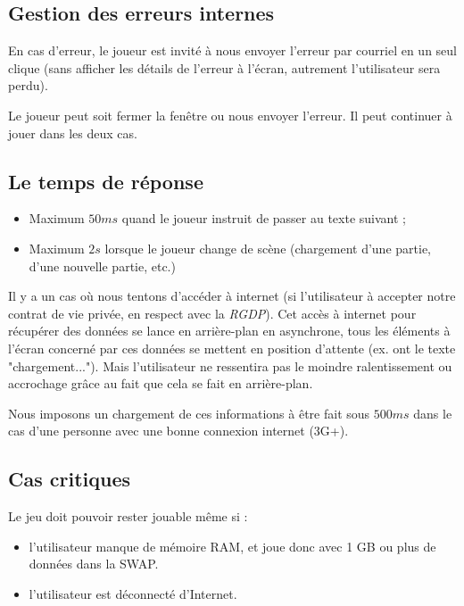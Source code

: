 \documentclass[final]{article}
\begin{document}
      \subsection{Gestion des erreurs internes}
        En cas d'erreur, le joueur est invité à nous envoyer l'erreur par courriel 
        en un seul clique 
        (sans afficher les détails de l'erreur à l'écran, autrement l'utilisateur sera perdu).
        
        Le joueur peut soit fermer la fenêtre ou nous envoyer l'erreur. 
        Il peut continuer à jouer dans les deux cas.

      \subsection{Le temps de réponse}
        \begin{itemize}
          \item Maximum $ 50ms $ quand le joueur instruit de passer au texte suivant ;
          \item Maximum $ 2s $ lorsque le joueur change de scène 
                (chargement d'une partie, d'une nouvelle partie, etc.)
        \end{itemize}
        
        Il y a un cas où nous tentons d'accéder à internet 
        (si l'utilisateur à accepter notre contrat de vie privée, en respect avec la \emph{RGDP}).
        Cet accès à internet pour récupérer des données se lance en arrière-plan en asynchrone,
        tous les éléments à l'écran concerné par ces données se mettent en position d'attente
        (ex. ont le texte "chargement..."). Mais l'utilisateur ne ressentira pas le moindre
        ralentissement ou accrochage grâce au fait que cela se fait en arrière-plan.
        
        Nous imposons un chargement de ces informations à être fait sous $ 500ms $ 
        dans le cas d'une personne avec une bonne connexion internet (3G+).

      \subsection{Cas critiques}
        Le jeu doit pouvoir rester jouable même si :
        \begin{itemize}
          \item l'utilisateur manque de mémoire RAM, 
                et joue donc avec 1 GB ou plus de données dans la SWAP.
          \item l'utilisateur est déconnecté d'Internet.
        \end{itemize}
\end{document}
